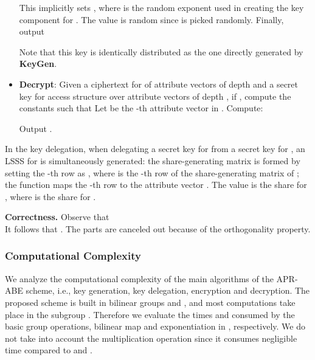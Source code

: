 \documentclass[twocolumn]{svjour3}          \smartqed  \usepackage{graphicx}
\begin{document}
\begin{itemize}
       
       
       
       
       
       This implicitly sets , where  is the random exponent used in creating the key component for
       . The value  is random since  is picked randomly.
       Finally, output
       
       Note that this key is identically distributed as the one directly generated by \textbf{KeyGen}.

\medskip
  \item  \textbf{Decrypt}: Given a ciphertext  for  of attribute
      vectors of depth  and a secret key
    for access structure  over attribute vectors of
   depth , if , compute the constants  such that 
      Let  be the -th attribute vector in . Compute:
      
      Output .
\end{itemize}

\begin{remark}
In the key delegation, when delegating a secret key for  from a secret key for , an LSSS  for  is
simultaneously generated: the share-generating matrix  is formed by setting the -th row as , where  is the
-th row of the share-generating matrix of ; the function  maps the -th row to the attribute vector . The value
 is the share for , where  is the share for
.
\end{remark}

\noindent\textbf{Correctness.} Observe that\\





It follows that . The  parts are canceled out because of the orthogonality property.

\subsubsection{Computational Complexity}

We analyze the computational complexity of the 
main algorithms of the APR-ABE scheme, i.e., key generation, key delegation, encryption and decryption. The proposed scheme is built in bilinear groups 
 and , and most computations take place in the subgroup . Therefore we evaluate the times  and  
consumed by the basic group operations, bilinear map and exponentiation in , respectively. We do not take into account the multiplication operation since it consumes negligible time compared to  and .
\end{document}

